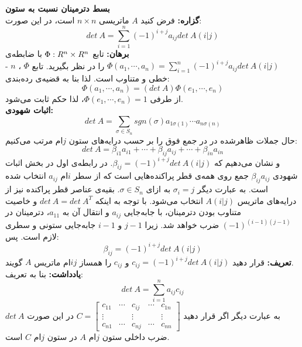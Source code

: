 
\textbf{بسط دترمینان نسبت به ستون}\\
\textbf{گزاره:} فرض کنید $A$ ماتریسی $n\times n$ است، در این صورت:
$$det\: A = \sum_{i=1}^n (-1)^{i+j}a_{ij}det\: A(i|j)$$
\textbf{برهان:} تابع $\Phi: R^n\time\cdot\times R^n $ با ضابطه‌ی $\Phi (a_1,\cdots, a_n) = \sum_{i=1}^n (-1)^{i+j}a_{ij}det\: A(i|j)$ را در نظر بگیرید. تابع $\Phi$ ، $n$ - خطی و متناوب است. لذا بنا به قضیه‌ی رده‌بندی:
$$\Phi(a_1,\cdots,a_n)= (det\: A)\Phi(e_1,\cdots,e_n)$$
از طرفی $\Phi(e_1,\cdots,e_n)=1$، لذا حکم ثابت می‌شود.\\
\textbf{اثبات شهودی:}
$$det\: A = \sum_{\sigma\in S_n} sgn(\sigma) a_{1\sigma(1)}\cdots a_{n\sigma(n)}$$
حال جملات ظاهر‌شده در در جمع فوق را بر حسب درایه‌های ستون $j$ام مرتب می‌کنیم:
$$det\: A = \beta_{i1}a_{i1} + \cdots + \beta_{ij}a_{ij} + \cdots + \beta_{in}a_{in}$$
و نشان می‌دهیم که $\beta_{ij} = (-1)^{i+j}det\: A(i|j)$. در رابطه‌ی اول در بخش اثبات شهودی $\beta_{ij}a_{ij}$ جمع روی همه‌ی قطر پراکنده‌هایی است که از سطر $i$ام $a_{ij}$ انتخاب شده است. به عبارت دیگر $\sigma_i = j$ به ازای $\sigma\in S_n$. بقیه‌ی عناصر قطر پراکنده نیز از درایه‌های ماتریس $A(i|j)$ انتخاب می‌شود. با توجه به اینکه $det\: A = det\: A^T$ و خاصیت متناوب بودن دترمینان، با جا‌به‌جایی $a_{ij}$ و انتقال آن به $a_{11}$، دترمینان در $(-1)^{(i-1)(j-1)}$ ضرب خواهد شد. زیرا $j-1$ و $i-1$ جا‌به‌جایی ستونی و سطری لازم است. پس:
$$\beta_{ij} = (-1)^{i+j}det\: A(i|j)$$
\textbf{تعریف:}
قرار دهید $c_{ij} = (-1)^{i+j}det\: A(i|j)$ و $c_{ij}$ را همساز $ij$ام ماتریس $A$ گویند.\\
\textbf{یادداشت:}
بنا به تعریف:
$$det\:A = \sum_{i=1}^n a_{ij}c_{ij}$$
به عبارت دیگر اگر قرار دهید $C= \begin{bmatrix}
c_{11}&\cdots&c_{ij}&\cdots&c_{1n}\\
\vdots &&\vdots&&\vdots\\
c_{n1} &\cdots &c_{nj}&\cdots&c_{nn}
\end{bmatrix}$ در این صورت $det\: A$ ضرب داخلی ستون $j$ام $A$ در ستون $j$ام $C$ است.


